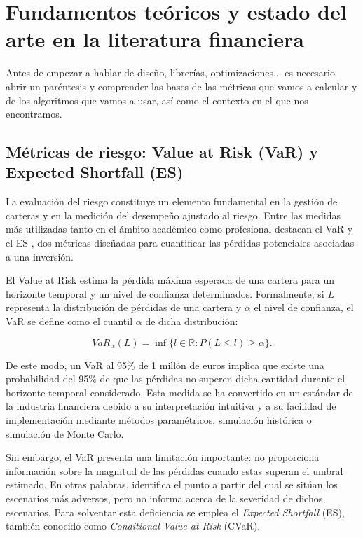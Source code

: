 \documentclass[11pt]{article}
\begin{document}
\newpage

\section{Fundamentos teóricos y estado del arte en la literatura financiera}

Antes de empezar a hablar de diseño, librerías, optimizaciones... es necesario abrir un paréntesis y comprender las bases de las métricas que vamos a calcular y de los algoritmos que vamos a usar, así como el contexto en el que nos encontramos.

\subsection{Métricas de riesgo: Value at Risk (VaR) y Expected Shortfall (ES)}

La evaluación del riesgo constituye un elemento fundamental en la gestión de carteras y en la medición del desempeño ajustado al riesgo. Entre las medidas más utilizadas tanto en el ámbito académico como profesional destacan el VaR \cite{jpmorgan1994riskmetrics} y el ES \cite{acerbi2002coherence}, dos métricas diseñadas para cuantificar las pérdidas potenciales asociadas a una inversión.

El Value at Risk estima la pérdida máxima esperada de una cartera para un horizonte temporal y un nivel de confianza determinados. Formalmente, si $L$ representa la distribución de pérdidas de una cartera y $\alpha$ el nivel de confianza, el VaR se define como el cuantil $\alpha$ de dicha distribución:

\begin{equation}
VaR_{\alpha}(L)=\inf\{l\in\mathbb{R}:P(L\leq l)\geq\alpha\}.
\end{equation}

De este modo, un VaR al 95\% de 1 millón de euros implica que existe una probabilidad del 95\% de que las pérdidas no superen dicha cantidad durante el horizonte temporal considerado. Esta medida se ha convertido en un estándar de la industria financiera debido a su interpretación intuitiva y a su facilidad de implementación mediante métodos paramétricos, simulación histórica o simulación de Monte Carlo.

Sin embargo, el VaR presenta una limitación importante: no proporciona información sobre la magnitud de las pérdidas cuando estas superan el umbral estimado. En otras palabras, identifica el punto a partir del cual se sitúan los escenarios más adversos, pero no informa acerca de la severidad de dichos escenarios. Para solventar esta deficiencia se emplea el \textit{Expected Shortfall} (ES), también conocido como \textit{Conditional Value at Risk} (CVaR).
\end{document}
